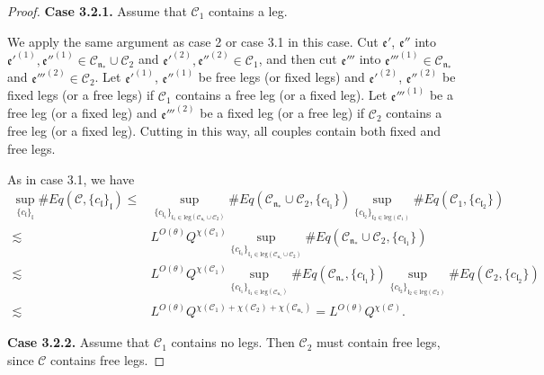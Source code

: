 \begin{proof}
\textbf{Case 3.2.1.} Assume that $\mathcal{C}_1$ contains a leg. 

We apply the same argument as case 2 or case 3.1 in this case. Cut $\mathfrak{e}'$, $\mathfrak{e}''$ into $\mathfrak{e}'^{(1)}, \mathfrak{e}''^{(1)}\in  \mathcal{C}_{\mathfrak{n}_*}\cup \mathcal{C}_2$ and $\mathfrak{e}'^{(2)}, \mathfrak{e}''^{(2)}\in  \mathcal{C}_1$, and then cut $\mathfrak{e}'''$ into $\mathfrak{e}'''^{(1)}\in  \mathcal{C}_{\mathfrak{n}_*}$ and $\mathfrak{e}'''^{(2)}\in  \mathcal{C}_2$. Let $\mathfrak{e}'^{(1)}$, $\mathfrak{e}''^{(1)}$ be free legs (or fixed legs) and $\mathfrak{e}'^{(2)}$, $\mathfrak{e}''^{(2)}$ be fixed legs (or a free legs) if $\mathcal{C}_1$ contains a free leg (or a fixed leg). Let $\mathfrak{e}'''^{(1)}$ be a free leg (or a fixed leg) and $\mathfrak{e}'''^{(2)}$ be a fixed leg (or a free leg) if $\mathcal{C}_2$ contains a free leg (or a fixed leg). Cutting in this way, all couples contain both fixed and free legs.

As in case 3.1, we have
\begin{equation}
\begin{split}
    \sup_{\{c_{\mathfrak{l}}\}_{\mathfrak{l}}}\#Eq(\mathcal{C},\{c_{\mathfrak{l}}\}_{\mathfrak{l}})
    \le&
    \sup_{\{c_{\mathfrak{l}_1}\}_{\mathfrak{l}_1\in \text{leg}(\mathcal{C}_{\mathfrak{n}_*}\cup \mathcal{C}_2)} } \# Eq(\mathcal{C}_{\mathfrak{n}_*}\cup \mathcal{C}_2,\{c_{\mathfrak{l}_1}\}) \sup_{\{c_{\mathfrak{l}_2}\}_{\mathfrak{l}_2\in \text{leg}(\mathcal{C}_1)} }\# Eq(\mathcal{C}_{1}, \{c_{\mathfrak{l}_2}\})
    \\
    \lesssim&  L^{O(\theta)} Q^{\chi(\mathcal{C}_1)}\sup_{\{c_{\mathfrak{l}_1}\}_{\mathfrak{l}_1\in \text{leg}(\mathcal{C}_{\mathfrak{n}_*}\cup \mathcal{C}_2)} } \# Eq(\mathcal{C}_{\mathfrak{n}_*}\cup \mathcal{C}_2,\{c_{\mathfrak{l}_1}\})
    \\
    \lesssim&  L^{O(\theta)} Q^{\chi(\mathcal{C}_1)} \sup_{\{c_{\mathfrak{l}_1}\}_{\mathfrak{l}_1\in \text{leg}(\mathcal{C}_{\mathfrak{n}_*})} } \# Eq(\mathcal{C}_{\mathfrak{n}_*},\{c_{\mathfrak{l}_1}\}) \sup_{\{c_{\mathfrak{l}_2}\}_{\mathfrak{l}_2\in \text{leg}(\mathcal{C}_2)} }\# Eq(\mathcal{C}_{2}, \{c_{\mathfrak{l}_2}\})
    \\
    \lesssim&  L^{O(\theta)} Q^{\chi(\mathcal{C}_1)+\chi(\mathcal{C}_2)+\chi(\mathcal{C}_{\mathfrak{n}_*})}=L^{O(\theta)} Q^{\chi(\mathcal{C})}.
\end{split}
\end{equation}

\textbf{Case 3.2.2.} Assume that $\mathcal{C}_1$ contains no legs. Then $\mathcal{C}_2$ must contain free legs, since $\mathcal{C}$ contains free legs. 


\end{proof}
